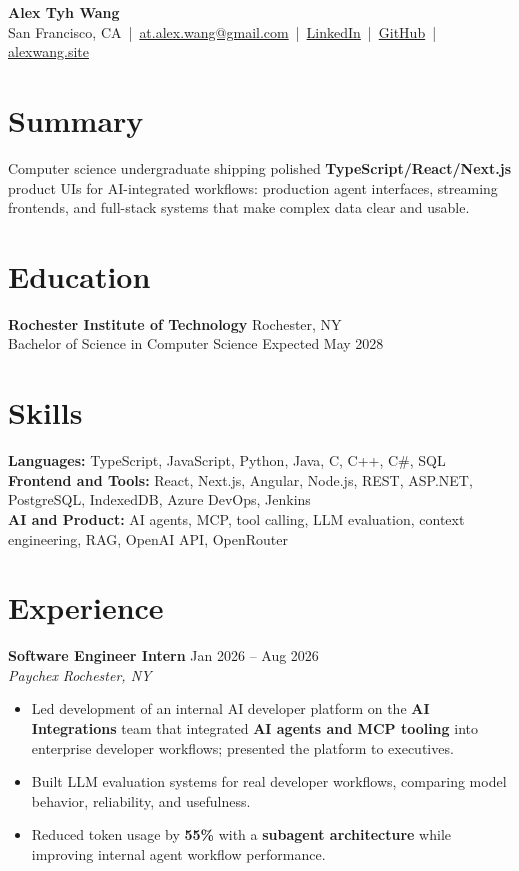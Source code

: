 \documentclass[10pt,letterpaper]{article}
\newif\ifresumeFirstRole
\newcommand{\resumeRole}[4]{%
  \ifresumeFirstRole
    \global\resumeFirstRolefalse
  \else
    \vspace{0pt plus 1fill}%
  \fi
  \textbf{#1} \hfill #2\\
  \textit{#3} \hfill \textit{#4}
}
\begin{document}
\begin{center}
{\Large \textbf{Alex Tyh Wang}}\\
San Francisco, CA \,|\, \href{mailto:at.alex.wang@gmail.com}{at.alex.wang@gmail.com} \,|\, \href{https://www.linkedin.com/in/alex-tyh-wang/}{LinkedIn} \,|\, \href{https://github.com/alextyhwang}{GitHub} \,|\, \href{https://alexwang.site}{alexwang.site}
\end{center}

\section*{Summary}
Computer science undergraduate shipping polished \textbf{TypeScript/React/Next.js} product UIs for AI-integrated workflows: production agent interfaces, streaming frontends, and full-stack systems that make complex data clear and usable.

\section*{Education}
\textbf{Rochester Institute of Technology} \hfill Rochester, NY\\
Bachelor of Science in Computer Science \hfill Expected May 2028

\section*{Skills}
\textbf{Languages:} TypeScript, JavaScript, Python, Java, C, C++, C\#, SQL\\
\textbf{Frontend and Tools:} React, Next.js, Angular, Node.js, REST, ASP.NET, PostgreSQL, IndexedDB, Azure DevOps, Jenkins\\
\textbf{AI and Product:} AI agents, MCP, tool calling, LLM evaluation, context engineering, RAG, OpenAI API, OpenRouter

\section*{Experience}
\resumeRole{Software Engineer Intern}{Jan 2026 -- Aug 2026}{Paychex}{Rochester, NY}
\begin{itemize}
  \item Led development of an internal AI developer platform on the \textbf{AI Integrations} team that integrated \textbf{AI agents and MCP tooling} into enterprise developer workflows; presented the platform to executives.
  \item Built LLM evaluation systems for real developer workflows, comparing model behavior, reliability, and usefulness.
  \item Reduced token usage by \textbf{55\%} with a \textbf{subagent architecture} while improving internal agent workflow performance.
\end{itemize}
\end{document}
